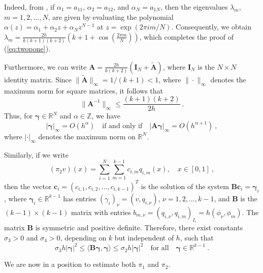 \documentclass{amsart}
\newcommand{\bc}{\mathbf{c}}
\newcommand{\bA}{\mathbf{A}}
\newcommand{\bB}{\mathbf{B}}
\newcommand{\bI}{\mathbf{I}}
\newcommand{\bgamma}{\boldsymbol{\gamma}}
\begin{document}
Indeed, from \cite{TW1974}, if $\alpha_1=a_{11}$, $\alpha_2=a_{12}$, and $\alpha_N=a_{1N}$, then the eigenvalues $\lambda_m$, $m=1,2,\dots, N$, are given by evaluating the polynomial $\alpha(z)=\alpha_1+\alpha_2 z+\alpha_N z^{N-1}$ at $z=\exp(2\pi i m/N)$. Consequently, we obtain
$\lambda_m=\frac{2h}{k(k+1)(k+2)}\left(k+1+\cos\left(\frac{2\pi m}{N}\right)\right)$,
which completes the proof of (\ref{eq:twopone}).  

Furthermore, we can write
$\bA=\frac{2h}{k(k+2)}\left(\bI_N+\widetilde{\bA}\right)$,
where $\bI_N$ is the $N\times N$ identity matrix. Since $\|\widetilde{\bA}\|_\infty=1/(k+1)<1$, where $\|\cdot\|_\infty$ denotes the maximum norm for square matrices, it follows that
$$\|\bA^{-1}\|_\infty\leq \frac{(k+1)(k+2)}{2h}\ .$$
%
Thus, for $\bgamma\in\mathbb{R}^N$ and $\alpha\in\mathbb{Z}$, we have
\begin{equation}\label{eq:twoptwo}
|\bgamma|_\infty=O\left(h^\alpha\right)\quad\text{if and only if}\quad |\mathbf{A}\bgamma|_\infty=O\left(h^{\alpha+1}\right)\ ,
\end{equation}
where $|\cdot|_\infty$ denotes the maximum norm on $\mathbb{R}^N$.

Similarly, if we write
\begin{equation}\label{eq:repr2}
(\pi_2 v)(x)=\sum_{i=1}^N\sum_{m=1}^{k-1} c_{i,m}q_{i,m}(x),\quad x\in [0,1]\ ,
\end{equation}
then the vector $\bc_i=(c_{i,1},c_{i,2},\dots,c_{i,k-1})^T$ is the solution of the system
$\bB \bc_i=\bgamma_i$,
where $\bgamma_i\in \mathbb{R}^{k-1}$ has entries $(\gamma_i)_\nu=(v,q_{i,\nu})$, $\nu=1,2,\dots,k-1$, and $\bB$ is the $(k-1)\times(k-1)$ matrix with entries $b_{m,\nu}=(q_{i,\nu},q_{i,m})_{I_i}=h(\phi_\nu,\phi_m)$. The matrix $\bB$ is symmetric and positive definite. Therefore, there exist constants $\sigma_3>0$ and $\sigma_4>0$, depending on $k$ but independent of $h$, such that 
\begin{equation}\label{eq:twopthree}
    \sigma_3 h |\bgamma|^2\leq \langle \bB \bgamma,\bgamma \rangle\leq \sigma_2 h|\bgamma|^2\quad \text{for all}\quad \bgamma\in \mathbb{R}^{k-1}\ . 
\end{equation}

We are now in a position to estimate both $\pi_1$ and $\pi_2$. 
\end{document}
